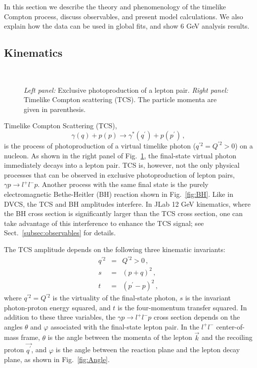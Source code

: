 In this section we describe the theory and phenomenology of the timelike
Compton process, discuss observables, and present model calculations. We
also explain how the data can be used in global fits, and show 6 GeV analysis
results.

\subsection{Kinematics}
\label{subsec:kinematics}

\begin{figure}[t]
\begin{center}
\mbox{
 \quad
{} }
\end{center}
\caption{\small{
{\it Left panel:} Exclusive photoproduction of a lepton pair.
{\it Right panel:} Timelike Compton scattering (TCS).
The particle momenta are given in parenthesis.}}
\label{fig:TCS_sketch}
\end{figure}

Timelike Compton Scattering (TCS), 
\begin{equation}
\gamma(q)+ p(p) \to \gamma^{\ast}(q^{\prime})+p(p^{\prime}) \,, 
\label{eq:TCS}
\end{equation}
is the process of photoproduction of a virtual timelike photon
($q^{{\prime} 2} = Q^{\prime 2} > 0$) on a nucleon. As shown in the right panel
of Fig.~\ref{fig:TCS_sketch}, the final-state virtual photon immediately decays
into a lepton pair. TCS is, however, not the only physical processes that can
be observed in exclusive photoproduction of lepton pairs,
$\gamma p \to l^{+} l^{-}p$. Another process with the same final state is the
purely electromagnetic Bethe-Heitler (BH) reaction shown in Fig.~\ref{fig:BH}.
Like in DVCS, the TCS and BH amplitudes interfere. In JLab 12 GeV kinematics,
where the BH cross section is significantly larger than the TCS cross section,
one can take advantage of this interference to enhance the TCS signal;
see Sect.~\ref{subsec:observables} for details.

The TCS amplitude depends on the following three kinematic invariants:
\begin{eqnarray}
q^{{\prime} 2} &=& Q^{\prime 2} > 0 \,, \nonumber\\ 
s & = & (p+q)^2 \,, \nonumber\\
t & =& (p^{\prime}-p)^2 \,,
\end{eqnarray}
where $q^{{\prime} 2} = Q^{\prime 2}$ is the virtuality of the final-state
photon, $s$ is the invariant photon-proton energy squared, and $t$ is the
four-momentum transfer squared.
In addition to these three variables, the $\gamma p \to l^{+} l^{-}p$ cross
section depends on the angles $\theta$ and $\varphi$ associated with the
final-state lepton pair. In the $l^{+} l^{-}$ center-of-mass frame, $\theta$
is the angle between the momenta of the lepton $\vec{k}$ and the recoiling
proton $\vec{q^{\prime}}$, and $\varphi$ is the angle between the reaction
plane and the lepton decay plane, as shown in Fig.~\ref{fig:Angle}.

